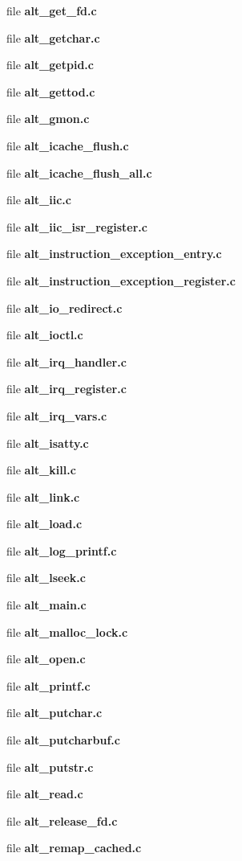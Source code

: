 \begin{DoxyCompactItemize}
file {\bf alt\+\_\+get\+\_\+fd.\+c}
\item 
file {\bf alt\+\_\+getchar.\+c}
\item 
file {\bf alt\+\_\+getpid.\+c}
\item 
file {\bf alt\+\_\+gettod.\+c}
\item 
file {\bf alt\+\_\+gmon.\+c}
\item 
file {\bf alt\+\_\+icache\+\_\+flush.\+c}
\item 
file {\bf alt\+\_\+icache\+\_\+flush\+\_\+all.\+c}
\item 
file {\bf alt\+\_\+iic.\+c}
\item 
file {\bf alt\+\_\+iic\+\_\+isr\+\_\+register.\+c}
\item 
file {\bf alt\+\_\+instruction\+\_\+exception\+\_\+entry.\+c}
\item 
file {\bf alt\+\_\+instruction\+\_\+exception\+\_\+register.\+c}
\item 
file {\bf alt\+\_\+io\+\_\+redirect.\+c}
\item 
file {\bf alt\+\_\+ioctl.\+c}
\item 
file {\bf alt\+\_\+irq\+\_\+handler.\+c}
\item 
file {\bf alt\+\_\+irq\+\_\+register.\+c}
\item 
file {\bf alt\+\_\+irq\+\_\+vars.\+c}
\item 
file {\bf alt\+\_\+isatty.\+c}
\item 
file {\bf alt\+\_\+kill.\+c}
\item 
file {\bf alt\+\_\+link.\+c}
\item 
file {\bf alt\+\_\+load.\+c}
\item 
file {\bf alt\+\_\+log\+\_\+printf.\+c}
\item 
file {\bf alt\+\_\+lseek.\+c}
\item 
file {\bf alt\+\_\+main.\+c}
\item 
file {\bf alt\+\_\+malloc\+\_\+lock.\+c}
\item 
file {\bf alt\+\_\+open.\+c}
\item 
file {\bf alt\+\_\+printf.\+c}
\item 
file {\bf alt\+\_\+putchar.\+c}
\item 
file {\bf alt\+\_\+putcharbuf.\+c}
\item 
file {\bf alt\+\_\+putstr.\+c}
\item 
file {\bf alt\+\_\+read.\+c}
\item 
file {\bf alt\+\_\+release\+\_\+fd.\+c}
\item 
file {\bf alt\+\_\+remap\+\_\+cached.\+c}

\end{DoxyCompactItemize}
